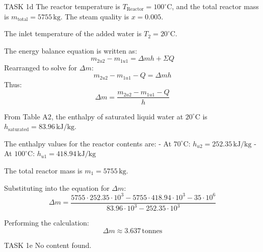 TASK 1d  
The reactor temperature is \( T_{\text{Reactor}} = 100^\circ\text{C} \), and the total reactor mass is \( m_{\text{total}} = 5755 \, \text{kg} \). The steam quality is \( x = 0.005 \).  

The inlet temperature of the added water is \( T_2 = 20^\circ\text{C} \).  

The energy balance equation is written as:  
\[
m_{2u2} - m_{1u1} = \Delta m h + \Sigma Q
\]  
Rearranged to solve for \( \Delta m \):  
\[
m_{2u2} - m_{1u1} - Q = \Delta m h
\]  
Thus:  
\[
\Delta m = \frac{m_{2u2} - m_{1u1} - Q}{h}
\]  

From Table A2, the enthalpy of saturated liquid water at \( 20^\circ\text{C} \) is \( h_{\text{saturated}} = 83.96 \, \text{kJ/kg} \).  

The enthalpy values for the reactor contents are:  
- At \( 70^\circ\text{C} \): \( h_{u2} = 252.35 \, \text{kJ/kg} \)  
- At \( 100^\circ\text{C} \): \( h_{u1} = 418.94 \, \text{kJ/kg} \)  

The total reactor mass is \( m_1 = 5755 \, \text{kg} \).  

Substituting into the equation for \( \Delta m \):  
\[
\Delta m = \frac{5755 \cdot 252.35 \cdot 10^3 - 5755 \cdot 418.94 \cdot 10^3 - 35 \cdot 10^6}{83.96 \cdot 10^3 - 252.35 \cdot 10^3}
\]  

Performing the calculation:  
\[
\Delta m \approx 3.637 \, \text{tonnes}
\]  

TASK 1e  
No content found.